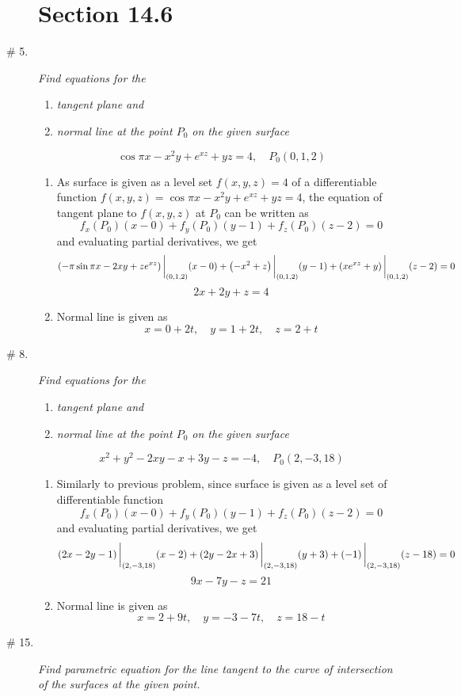 \documentclass[8pt]{article} %
\begin{document}
\begin{description}
\section{Section 14.6}
	\item[\# 5.]{{\it Find equations for the}
		\begin{enumerate}[\bfseries(a)]
			\item {\it tangent plane and}
			\item {\it normal line at the point $P_0$ on the given surface}
		\end{enumerate}
		\[\cos\pi x-x^2y+e^{xz}+yz=4,\quad P_0(0,1,2)\]
		\begin{enumerate}[\bfseries(a)]
			\item As surface is given as a level set $f(x,y,z)=4$ of a differentiable function $f(x,y,z)=
				\cos\pi x-x^2y+e^{xz}+yz=4$, the equation of tangent plane to $f(x,y,z)$ at $P_0$ can be written as
				\[f_x(P_0)(x-0)+f_y(P_0)(y-1)+f_z(P_0)(z-2)=0\]
				and evaluating partial derivatives, we get
				\[\left(-\pi\sin\pi x-2xy+ze^{xz}\right)\bigg|_{(0,1,2)}(x-0)+
				\left(-x^2+z\right)\bigg|_{(0,1,2)}(y-1)+
				\left(xe^{xz}+y\right)\bigg|_{(0,1,2)}(z-2)=0
				\]
				\[2x+2y+z=4\]
			\item Normal line is given as
				\[x=0+2t,\quad y=1+2t,\quad z=2+t\]
		\end{enumerate}
		}
	\item[\# 8.]{{\it Find equations for the}
		\begin{enumerate}[\bfseries(a)]
			\item {\it tangent plane and}
			\item {\it normal line at the point $P_0$ on the given surface}
		\end{enumerate}
		\[x^2+y^2-2xy-x+3y-z=-4,\quad P_0(2,-3,18)\]
		\begin{enumerate}[\bfseries(a)]
			\item Similarly to previous problem, since surface is given as a level set of differentiable function
				\[f_x(P_0)(x-0)+f_y(P_0)(y-1)+f_z(P_0)(z-2)=0\]
				and evaluating partial derivatives, we get
				\[\left(2x-2y-1\right)\bigg|_{(2,-3,18)}(x-2)+
				\left(2y-2x+3\right)\bigg|_{(2,-3,18)}(y+3)+
				\left(-1\right)\bigg|_{(2,-3,18)}(z-18)=0
				\]
				\[9x-7y-z=21\]
			\item Normal line is given as
				\[x=2+9t,\quad y=-3-7t,\quad z=18-t\]
		\end{enumerate}
		}
	\item[\# 15.]{{\it Find parametric equation for the line tangent to the curve of intersection of the surfaces at the given point.}
}
\end{description}
\end{document}
